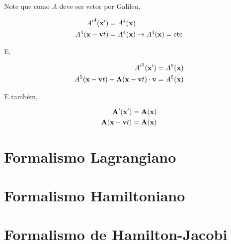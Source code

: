\documentclass[twoside]{amsart}
\numberwithin{equation}{section}
\begin{document}
Note que como $A$ deve ser vetor por Galileu,

\begin{align}
    {A'}^4\qty(\vb x ')&=A^4\qty(\vb x)\\
    A^4\qty(\vb x-\vb vt)&=A^4\qty(\vb x)\rightarrow A^4\qty(\vb x)=\textup{cte}
\end{align}

E,

\begin{align}
    {A'}^5\qty(\vb x')&=A^5\qty(\vb x)\\
    {A}^5\qty(\vb x-\vb vt)+\vb A\qty(\vb x-\vb vt)\cdot \vb v&=A^5\qty(\vb x)
\end{align}

E também,

\begin{align}
    {\vb A}'\qty(\vb x')&=\vb A\qty(\vb x)\\
    \vb A\qty(\vb x-\vb v t)&=\vb A\qty(\vb x)
\end{align}



\section{Formalismo Lagrangiano}





\section{Formalismo Hamiltoniano}




\section{Formalismo de Hamilton-Jacobi}
\end{document}
